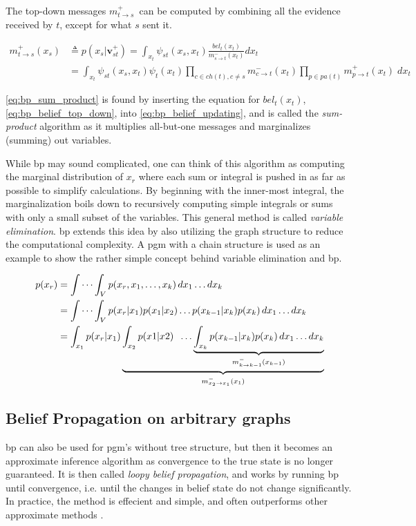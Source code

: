 The top-down messages $m_{t \to s}^+$ can be computed by combining all the evidence received by $t$, except for what $s$ sent it.

\begin{subequations}
\begin{align}
    m_{t \to s}^+(x_s) &\triangleq p(x_s | \mathbf{v}_{st}^+) = \int_{x_t}\psi_{st}(x_s, x_t)\frac{bel_t(x_t)}{m_{s \to t}^-(x_t)}dx_t \label{eq:bp_belief_updating}\\
    &= \int_{x_t} \psi_{st}(x_s, x_t)\psi_t(x_t) \prod_{c \in ch(t), c \neq s} m_{c \to t}^-(x_t) \prod_{p \in pa(t)} m_{p \to t}^+(x_t) \; dx_t\label{eq:bp_sum_product}
\end{align}
\end{subequations}

\cref{eq:bp_sum_product} is found by inserting the equation for $bel_t(x_t)$, \cref{eq:bp_belief_top_down}, into \cref{eq:bp_belief_updating}, and is called the \textit{sum-product} algorithm as it multiplies all-but-one messages and marginalizes (summing) out variables. 

While \acrshort{bp} may sound complicated, one can think of this algorithm as computing the marginal distribution of $x_r$ where each sum or integral is pushed in as far as possible to simplify calculations. By beginning with the inner-most integral, the marginalization boils down to recursively computing simple integrals or sums with only a small subset of the variables. This general method is called \textit{variable elimination}\cite{murphy}. \acrshort{bp} extends this idea by also utilizing the graph structure to reduce the computational complexity. A \acrshort{pgm} with a chain structure is used as an example to show the rather simple concept behind variable elimination and \acrshort{bp}.

\begin{subequations}
\begin{align}
p(x_r) &= \idotsint_V p(x_r, x_1,\dots,x_k) \,dx_1 \dots dx_k\\
&= \idotsint_V p(x_r | x_1)p(x_1|x_2)\dots p(x_{k-1} | x_k)p(x_k) \, dx_1 \dots dx_k\\
&= \int_{x_1} p(x_r | x_1)\underbrace{\int_{x_2}p(x1 | x2) \; \;  \dots \underbrace{\int_{x_k} p(x_{k-1} | x_k)p(x_k) \, dx_1 \dots dx_k}_{m_{k\to k-1}^-(x_{k-1})}}_{m_{x_2 \to x_1}^-(x_1)}
\end{align}
\end{subequations}

\subsection{Belief Propagation on arbitrary graphs}
\acrshort{bp} can also be used for \acrshort{pgm}'s without tree structure, but then it becomes an approximate inference algorithm as convergence to the true state is no longer guaranteed. It is then called \textit{loopy belief propagation}, and works by running \acrshort{bp} until convergence, i.e. until the changes in belief state do not change significantly.  In practice, the method is effecient and simple, and often outperforms other approximate methods \cite{murphy}.

